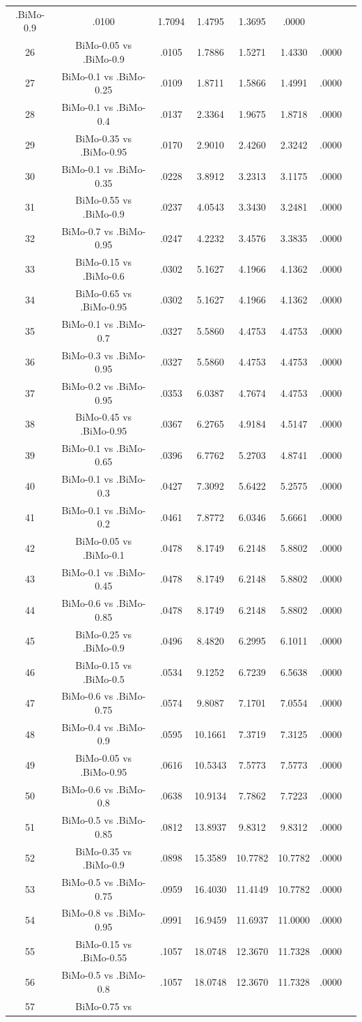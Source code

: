 \documentclass[a4paper,10pt]{article}
\begin{document}
\begin{landscape}
\begin{table}[!htp]
\begin{tabular}{cccccccc}
.BiMo-0.9&.0100&1.7094&1.4795&1.3695&.0000\\26&BiMo-0.05 vs .BiMo-0.9&.0105&1.7886&1.5271&1.4330&.0000\\27&BiMo-0.1 vs .BiMo-0.25&.0109&1.8711&1.5866&1.4991&.0000\\28&BiMo-0.1 vs .BiMo-0.4&.0137&2.3364&1.9675&1.8718&.0000\\29&BiMo-0.35 vs .BiMo-0.95&.0170&2.9010&2.4260&2.3242&.0000\\30&BiMo-0.1 vs .BiMo-0.35&.0228&3.8912&3.2313&3.1175&.0000\\31&BiMo-0.55 vs .BiMo-0.9&.0237&4.0543&3.3430&3.2481&.0000\\32&BiMo-0.7 vs .BiMo-0.95&.0247&4.2232&3.4576&3.3835&.0000\\33&BiMo-0.15 vs .BiMo-0.6&.0302&5.1627&4.1966&4.1362&.0000\\34&BiMo-0.65 vs .BiMo-0.95&.0302&5.1627&4.1966&4.1362&.0000\\35&BiMo-0.1 vs .BiMo-0.7&.0327&5.5860&4.4753&4.4753&.0000\\36&BiMo-0.3 vs .BiMo-0.95&.0327&5.5860&4.4753&4.4753&.0000\\37&BiMo-0.2 vs .BiMo-0.95&.0353&6.0387&4.7674&4.4753&.0000\\38&BiMo-0.45 vs .BiMo-0.95&.0367&6.2765&4.9184&4.5147&.0000\\39&BiMo-0.1 vs .BiMo-0.65&.0396&6.7762&5.2703&4.8741&.0000\\40&BiMo-0.1 vs .BiMo-0.3&.0427&7.3092&5.6422&5.2575&.0000\\41&BiMo-0.1 vs .BiMo-0.2&.0461&7.8772&6.0346&5.6661&.0000\\42&BiMo-0.05 vs .BiMo-0.1&.0478&8.1749&6.2148&5.8802&.0000\\43&BiMo-0.1 vs .BiMo-0.45&.0478&8.1749&6.2148&5.8802&.0000\\44&BiMo-0.6 vs .BiMo-0.85&.0478&8.1749&6.2148&5.8802&.0000\\45&BiMo-0.25 vs .BiMo-0.9&.0496&8.4820&6.2995&6.1011&.0000\\46&BiMo-0.15 vs .BiMo-0.5&.0534&9.1252&6.7239&6.5638&.0000\\47&BiMo-0.6 vs .BiMo-0.75&.0574&9.8087&7.1701&7.0554&.0000\\48&BiMo-0.4 vs .BiMo-0.9&.0595&10.1661&7.3719&7.3125&.0000\\49&BiMo-0.05 vs .BiMo-0.95&.0616&10.5343&7.5773&7.5773&.0000\\50&BiMo-0.6 vs .BiMo-0.8&.0638&10.9134&7.7862&7.7223&.0000\\51&BiMo-0.5 vs .BiMo-0.85&.0812&13.8937&9.8312&9.8312&.0000\\52&BiMo-0.35 vs .BiMo-0.9&.0898&15.3589&10.7782&10.7782&.0000\\53&BiMo-0.5 vs .BiMo-0.75&.0959&16.4030&11.4149&10.7782&.0000\\54&BiMo-0.8 vs .BiMo-0.95&.0991&16.9459&11.6937&11.0000&.0000\\55&BiMo-0.15 vs .BiMo-0.55&.1057&18.0748&12.3670&11.7328&.0000\\56&BiMo-0.5 vs .BiMo-0.8&.1057&18.0748&12.3670&11.7328&.0000\\57&BiMo-0.75 vs 
\end{tabular}
\end{table}
\end{landscape}
\end{document}
